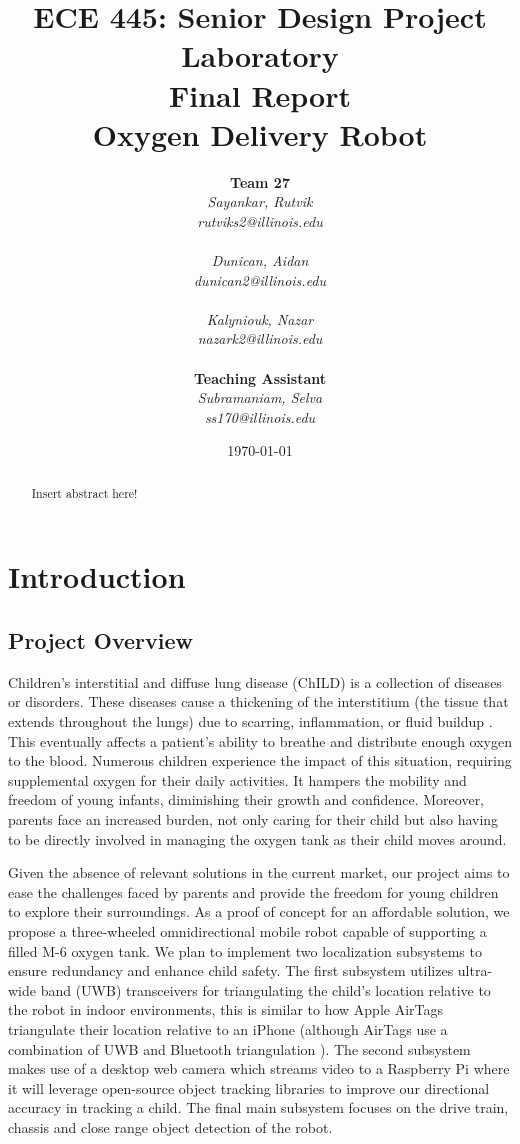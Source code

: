 \documentclass{report}
\title{ECE 445: Senior Design Project Laboratory \\ Final Report \\ Oxygen Delivery Robot} %
\author {
    \textbf{Team 27} \\ 
    \textit{Sayankar, Rutvik}\\
    \textit{rutviks2@illinois.edu} \\
    \hfill \\ 
    \textit{Dunican, Aidan}\\
    \textit{dunican2@illinois.edu} \\
    \hfill \\ 
    \textit{Kalyniouk, Nazar}\\
    \textit{nazark2@illinois.edu} \\
    \hfill \\ 
    \textbf{Teaching Assistant} \\ 
    \textit{Subramaniam, Selva} \\
    \textit{ss170@illinois.edu} 
}
\date{\today} %
\begin{document}
    \maketitle %

    \begin{abstract}
        Insert abstract here!
    \end{abstract}
    
    \pagebreak
    \tableofcontents %
    \pagebreak

    \chapter{Introduction}
    \section{Project Overview}
    Children's interstitial and diffuse lung disease (ChILD) is a collection of diseases or disorders. These diseases cause a thickening of the interstitium (the tissue that extends throughout the lungs) due to scarring, inflammation, or fluid buildup \cite{ChILD-2022}. This eventually affects a patient’s ability to breathe and distribute enough oxygen to the blood. Numerous children experience the impact of this situation, requiring supplemental oxygen for their daily activities. It hampers the mobility and freedom of young infants, diminishing their growth and confidence. Moreover, parents face an increased burden, not only caring for their child but also having to be directly involved in managing the oxygen tank as their child moves around.

    Given the absence of relevant solutions in the current market, our project aims to ease the challenges faced by parents and provide the freedom for young children to explore their surroundings. As a proof of concept for an affordable solution, we propose a three-wheeled omnidirectional mobile robot capable of supporting a filled M-6 oxygen tank. We plan to implement two localization subsystems to ensure redundancy and enhance child safety. The first subsystem utilizes ultra-wide band (UWB) transceivers for triangulating the child's location relative to the robot in indoor environments, this is similar to how Apple AirTags triangulate their location relative to an iPhone \cite{airtag_uwb} (although AirTags use a combination of UWB and Bluetooth triangulation \cite{airtag_ble}). The second subsystem makes use of a desktop web camera which streams video to a Raspberry Pi where it will leverage open-source object tracking libraries to improve our directional accuracy in tracking a child. The final main subsystem focuses on the drive train, chassis and close range object detection of the robot.
\end{document}
